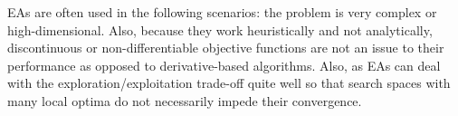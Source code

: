 EAs are often used in the following scenarios: the problem is very complex or high-dimensional. Also, because they work heuristically and not analytically, discontinuous or non-differentiable objective functions are not an issue to their performance as opposed to derivative-based algorithms. Also, as EAs can deal with the exploration/exploitation trade-off quite well so that search spaces with many local optima do not necessarily impede their convergence. 
